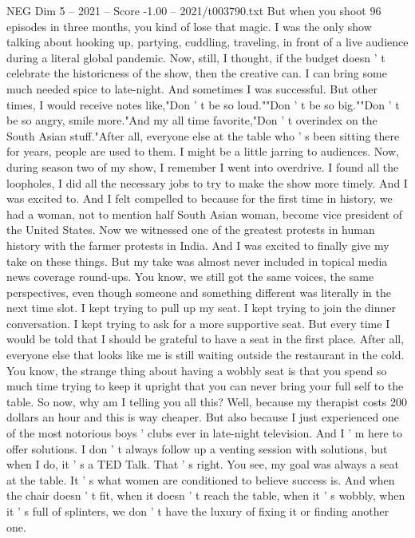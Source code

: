 \begin{textsample}{NEG Dim 5 – 2021 – Score -1.00 – 2021/t003790.txt}
But when you shoot 96 episodes in three months, you kind of lose that magic.
I was the only show talking about hooking up, partying, cuddling, traveling, in front of a live audience during a literal global pandemic.
Now, still, I thought, if the budget doesn ' t celebrate the historicness of the show, then the creative can.
I can bring some much needed spice to late-night.
And sometimes I was successful.
But other times, I would receive notes like,"Don ' t be so loud.""Don ' t be so big.""Don ' t be so angry, smile more."And my all time favorite,"Don ' t overindex on the South Asian stuff."After all, everyone else at the table who ' s been sitting there for years, people are used to them.
I might be a little jarring to audiences.
Now, during season two of my show, I remember I went into overdrive.
I found all the loopholes, I did all the necessary jobs to try to make the show more timely.
And I was excited to.
And I felt compelled to because for the first time in history, we had a woman, not to mention half South Asian woman, become vice president of the United States.
Now we witnessed one of the greatest protests in human history with the farmer protests in India.
And I was excited to finally give my take on these things.
But my take was almost never included in topical media news coverage round-ups.
You know, we still got the same voices, the same perspectives, even though someone and something different was literally in the next time slot.
I kept trying to pull up my seat.
I kept trying to join the dinner conversation.
I kept trying to ask for a more supportive seat.
But every time I would be told that I should be grateful to have a seat in the first place.
After all, everyone else that looks like me is still waiting outside the restaurant in the cold.
You know, the strange thing about having a wobbly seat is that you spend so much time trying to keep it upright that you can never bring your full self to the table.
So now, why am I telling you all this?
Well, because my therapist costs 200 dollars an hour and this is way cheaper.
But also because I just experienced one of the most notorious boys ' clubs ever in late-night television.
And I ' m here to offer solutions.
I don ' t always follow up a venting session with solutions, but when I do, it ' s a TED Talk.
That ' s right.
You see, my goal was always a seat at the table.
It ' s what women are conditioned to believe success is.
And when the chair doesn ' t fit, when it doesn ' t reach the table, when it ' s wobbly, when it ' s full of splinters, we don ' t have the luxury of fixing it or finding another one.

\end{textsample}
